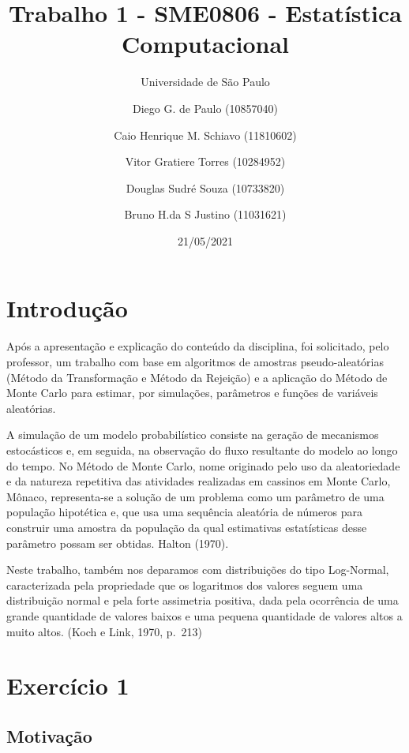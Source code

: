 \documentclass[11pt,]{article}
\title{Trabalho 1 - SME0806 - Estatística Computacional}
\subtitle{Universidade de São Paulo}
\author{Diego G. de Paulo (10857040) \and Caio Henrique M. Schiavo (11810602) \and Vitor Gratiere Torres (10284952) \and Douglas Sudré Souza (10733820) \and Bruno H.da S Justino (11031621)}
\date{21/05/2021}
\begin{document}
\maketitle

{
\setcounter{tocdepth}{3}
\tableofcontents
}
\newpage

\hypertarget{introduuxe7uxe3o}{%
\section{Introdução}\label{introduuxe7uxe3o}}

Após a apresentação e explicação do conteúdo da disciplina, foi
solicitado, pelo professor, um trabalho com base em algoritmos de
amostras pseudo-aleatórias (Método da Transformação e Método da
Rejeição) e a aplicação do Método de Monte Carlo para estimar, por
simulações, parâmetros e funções de variáveis aleatórias.

A simulação de um modelo probabilístico consiste na geração de
mecanismos estocásticos e, em seguida, na observação do fluxo resultante
do modelo ao longo do tempo. No Método de Monte Carlo, nome originado
pelo uso da aleatoriedade e da natureza repetitiva das atividades
realizadas em cassinos em Monte Carlo, Mônaco, representa-se a solução
de um problema como um parâmetro de uma população hipotética e, que usa
uma sequência aleatória de números para construir uma amostra da
população da qual estimativas estatísticas desse parâmetro possam ser
obtidas. Halton (1970).

Neste trabalho, também nos deparamos com distribuições do tipo
Log-Normal, caracterizada pela propriedade que os logaritmos dos valores
seguem uma distribuição normal e pela forte assimetria positiva, dada
pela ocorrência de uma grande quantidade de valores baixos e uma pequena
quantidade de valores altos a muito altos. (Koch e Link, 1970, p.~213)

\newpage

\hypertarget{exercuxedcio-1}{%
\section{Exercício 1}\label{exercuxedcio-1}}

\hypertarget{motivauxe7uxe3o}{%
\subsection{Motivação}\label{motivauxe7uxe3o}}

~
\end{document}
